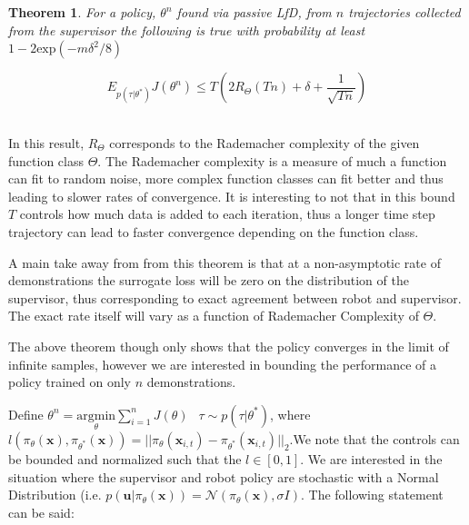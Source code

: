 \documentclass[10pt, conference]{ieeeconf}      %
\newtheorem{theorem}{Theorem}[section]
\newcommand{\bu}{\mathbf{u}}
\newcommand{\bx}{\mathbf{x}}
\begin{document}
\begin{theorem}\label{thm:sup}
For a policy, $\theta^n$ found via passive LfD, from $n$ trajectories collected from the supervisor the following is true with probability at least $1- 2\mbox{exp} (-m\delta^2/8)$

$$E_{p(\tau|\theta^*)} J(\theta^n)\leq T( 2R_{\Theta}(Tn) + \delta+ \frac{1}{\sqrt{Tn}})$$\\

\end{theorem}

In this result, $R_{\Theta}$ corresponds to the Rademacher complexity of the given function class $\Theta$. The Rademacher complexity is a measure of much a function can fit to random noise, more complex function classes can fit better and thus leading to slower rates of convergence. It is interesting to not that in this bound $T$ controls how much data is added to each iteration, thus a longer time step trajectory can lead to faster convergence depending on the function class. 

A main take away from from this theorem  is that at a non-asymptotic rate of demonstrations the surrogate loss will be zero on the distribution of the supervisor, thus corresponding to exact agreement between robot and supervisor. The exact rate itself will vary as a function of Rademacher Complexity of $\Theta$. 

The above theorem though only shows that the policy converges in the limit of infinite samples, however we are interested in bounding the performance of a policy trained on only $n$ demonstrations. 

 Define $\theta^n = \underset{\theta}{\mbox{argmin}} \sum^n_{i=1} J(\theta)$   $\:\:\tau \sim p(\tau|\theta^*)$, where $l(\pi_{\theta}(\bx),\pi_{\theta^*}(\bx)) = ||\pi_{\theta}(\bx_{i,t}) - \pi_{\theta^*}(\bx_{i,t})||_2$.We note that the controls can be bounded and normalized such that the $l \in [0,1]$.  We are interested in the situation where the supervisor and robot policy are stochastic with a Normal Distribution (i.e. $p(\bu|\pi_{\theta}(\bx)) = \mathcal{N}(\pi_\theta(\bx),\sigma I)$. The following statement can be said: \\
\end{document}

